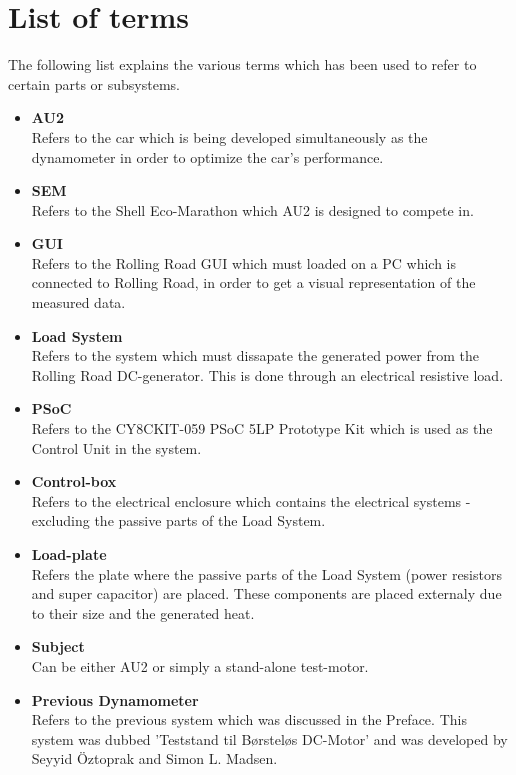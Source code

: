 \section{List of terms}
The following list explains the various terms which has been used to refer to certain parts or subsystems.
\begin{itemize}
	\item \textbf{AU2}\\
	Refers to the car which is being developed simultaneously as the dynamometer in order to optimize the car's performance.
	\item \textbf{SEM}\\
	Refers to the Shell Eco-Marathon which AU2 is designed to compete in.
	\item \textbf{GUI}\\
	Refers to the Rolling Road GUI which must loaded on a PC which is connected to Rolling Road, in order to get a visual representation of the measured data.
	\item \textbf{Load System}\\
	Refers to the system which must dissapate the generated power from the Rolling Road DC-generator. This is done through an electrical resistive load.
	\item \textbf{PSoC}\\
	Refers to the CY8CKIT-059 PSoC 5LP Prototype Kit which is used as the Control Unit in the system.
	\item \textbf{Control-box}\\
	Refers to the electrical enclosure which contains the electrical systems - excluding the passive parts of the Load System. 
	\item \textbf{Load-plate}\\
	Refers the plate where the passive parts of the Load System (power resistors and super capacitor) are placed. These components are placed externaly due to their size and the generated heat.
	\item \textbf{Subject}\\
	Can be either AU2 or simply a stand-alone test-motor.
	\item \textbf{Previous Dynamometer}\\
	Refers to the previous system which was discussed in the Preface. This system was dubbed 'Teststand til Børsteløs DC-Motor' and was developed by Seyyid Öztoprak and Simon L. Madsen.
\end{itemize}